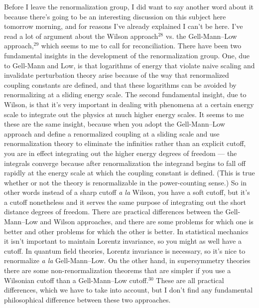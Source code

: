 \documentclass[12pt]{article}
\begin{document}
Before I leave the renormalization group, I did want to say
another word about it because there's going to be an
interesting discussion on this subject here tomorrow
morning, and for reasons I've already explained I can't be
here.  I've read  a lot of argument  about the Wilson
approach$^{28}$ vs. the
Gell-Mann--Low approach,$^{29}$ which seems to me to call
for
reconciliation.  There have been two fundamental insights in
the development of the renormalization group.  One, due to
Gell-Mann and Low, is that logarithms of energy that violate
naive scaling and invalidate perturbation theory arise
because of the way that renormalized coupling constants are
defined, and that these logarithms can be avoided by
renormalizing at a sliding energy scale.  The  second
fundamental insight, due to Wilson, is that it's very
important in dealing with phenomena at a certain energy
scale to integrate out the physics at much higher energy
scales.  It seems to me these are the same insight, because
when you adopt the Gell-Mann--Low approach and define a
renormalized coupling at a sliding scale and use
renormalization theory to eliminate the infinities rather
than an explicit cutoff, you are in effect integrating out
the higher energy degrees of freedom --- the integrals
converge because after renormalization the integrand begins
to fall off rapidly at the energy scale at which the
coupling constant is defined.  (This is true whether or not
the theory is renormalizable in the power-counting sense.)
So in other words instead of a sharp cutoff {\em a la}
Wilson, you have a soft cutoff, but it's a cutoff
nonetheless and it serves the same purpose of integrating
out the short distance degrees of freedom.    There are
practical differences between the Gell-Mann--Low and Wilson
approaches, and there are some problems for which one is
better and other problems for which the other is better.  In
statistical mechanics it isn't important to maintain Lorentz
invariance, so you might as well have a cutoff.  In  quantum
field theories, Lorentz invariance is necessary, so it's
nice to renormalize {\em a la} Gell-Mann--Low. On the other
hand, in supersymmetry theories there are some
non-renormalization theorems that are simpler if you use a
Wilsonian cutoff than a Gell-Mann--Low cutoff.$^{30}$  These
are
all practical differences, which we have to take into
account, but I don't find any fundamental philosophical
difference between these two approaches.
\end{document}
